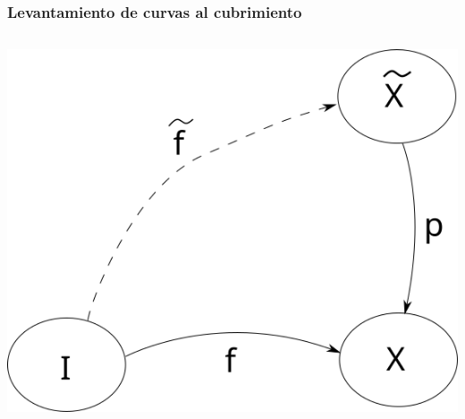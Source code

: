 \documentclass[xetex,mathserif,serif]{beamer}
\begin{document}
  \begin{frame}
    \frametitle{Levantamiento de curvas al cubrimiento}
    \begin{columns}
      \begin{column}{.5\textwidth}
        \centering
        \includegraphics[scale=0.3]{../tesis/imagenes/lifting-path.png}
      \end{column}
    \end{columns}
    \begin{column}{.5\textwidth}

    \end{column}
  \end{frame}
\end{document}
